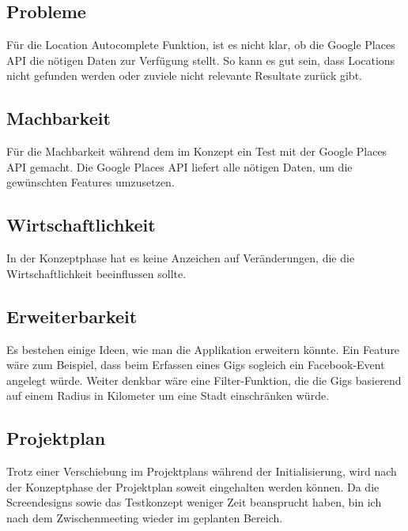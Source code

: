 \subsection{Probleme}

Für die Location Autocomplete Funktion, ist es nicht klar, ob die
Google Places API die nötigen Daten zur Verfügung stellt. So kann es gut sein,
dass Locations nicht gefunden werden oder zuviele nicht relevante Resultate
zurück gibt.

\subsection{Machbarkeit}

Für die Machbarkeit während dem im Konzept ein Test mit der Google Places API
gemacht. Die Google Places API liefert alle nötigen Daten, um die gewünschten
Features umzusetzen.

\subsection{Wirtschaftlichkeit}

In der Konzeptphase hat es keine Anzeichen auf Veränderungen, die die
Wirtschaftlichkeit beeinflussen sollte.

\subsection{Erweiterbarkeit}

Es bestehen einige Ideen, wie man die Applikation erweitern könnte. Ein Feature
wäre zum Beispiel, dass beim Erfassen eines Gigs sogleich ein Facebook-Event
angelegt würde. Weiter denkbar wäre eine Filter-Funktion, die die Gigs basierend
auf einem Radius in Kilometer um eine Stadt einschränken würde.

\subsection{Projektplan}

Trotz einer Verschiebung im Projektplans während der Initialisierung, wird nach
der Konzeptphase der Projektplan soweit eingehalten werden können. Da die
Screendesigns sowie das Testkonzept weniger Zeit beansprucht haben, bin ich
nach dem Zwischenmeeting wieder im geplanten Bereich.
